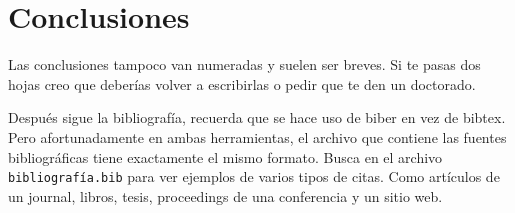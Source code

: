 \chapter*{Conclusiones}

Las conclusiones tampoco van numeradas y suelen ser breves.
Si te pasas dos hojas creo que deberías volver a escribirlas o pedir que te den un doctorado.

Después sigue la bibliografía, recuerda que se hace uso de biber en vez de bibtex.
Pero afortunadamente en ambas herramientas, el archivo que contiene las fuentes bibliográficas tiene exactamente el mismo formato.
Busca en el archivo \verb|bibliografía.bib| para ver ejemplos de varios tipos de citas.
Como artículos de un journal, libros, tesis, proceedings de una conferencia y un sitio web.

